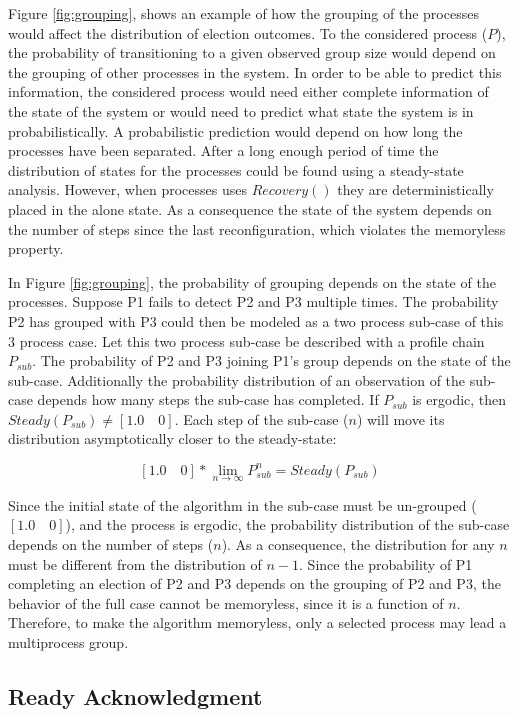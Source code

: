 Figure \ref{fig:grouping}, shows an example of how the grouping of the processes would affect the distribution of election outcomes.
To the considered process ($P$), the probability of transitioning to a given observed group size would depend on the grouping of other processes in the system.
In order to be able to predict this information, the considered process would need either complete information of the state of the system or would need to predict what state the system is in probabilistically.
A probabilistic prediction would depend on how long the processes have been separated.
After a long enough period of time the distribution of states for the processes could be found using a steady-state analysis.
However, when processes uses $Recovery()$ they are deterministically placed in the alone state.
As a consequence the state of the system depends on the number of steps since the last reconfiguration, which violates the memoryless property.

In Figure \ref{fig:grouping}, the probability of grouping depends on the state of the processes.
Suppose P1 fails to detect P2 and P3 multiple times.
The probability P2 has grouped with P3 could then be modeled as a two process sub-case of this 3 process case.
Let this two process sub-case be described with a profile chain $P_{sub}$.
The probability of P2 and P3 joining P1's group depends on the state of the sub-case.
Additionally the probability distribution of an observation of the sub-case depends how many steps the sub-case has completed.
If $P_{sub}$ is ergodic, then $Steady(P_{sub}{}) \neq [1.0 \quad 0]$.
Each step of the sub-case ($n$) will move its distribution asymptotically closer to the steady-state:

\[ [1.0 \quad 0] * \lim_{n \to \infty}P_{sub}^n = Steady(P_{sub}) \]

Since the initial state of the algorithm in the sub-case must be un-grouped ($[1.0 \quad 0]$), and the process is ergodic, the probability distribution of the sub-case depends on the number of steps ($n$).
As a consequence, the distribution for any $n$ must be different from the distribution of $n-1$.
Since the probability of P1 completing an election of P2 and P3 depends on the grouping of P2 and P3, the behavior of the full case cannot be memoryless, since it is a function of $n$.
Therefore, to make the algorithm memoryless, only a selected process may lead a multiprocess group.

\subsection{Ready Acknowledgment}

